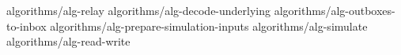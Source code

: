 {algorithms/alg-relay}
{algorithms/alg-decode-underlying}
{algorithms/alg-outboxes-to-inbox}
{algorithms/alg-prepare-simulation-inputs}
{algorithms/alg-simulate}
{algorithms/alg-read-write}

%
%
%
%
%
%
%
%
